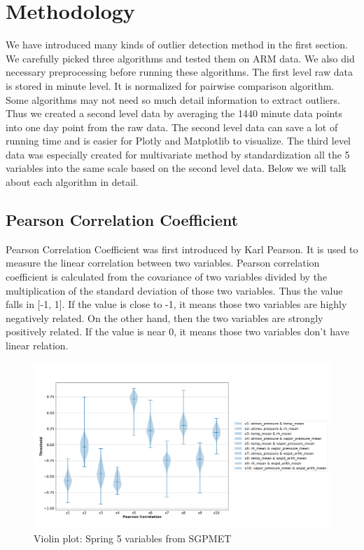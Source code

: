 \documentclass[letterpaper, 10 pt, conference]{ieeeconf}  %
\begin{document}
\section{Methodology}
We have introduced many kinds of outlier detection method in the first section. We carefully picked three algorithms and tested them on ARM data. We also did necessary preprocessing before running these algorithms. The first level raw data is stored in minute level. It is normalized for pairwise comparison algorithm. Some algorithms may not need so much detail information to extract outliers. Thus we created a second level data by averaging the 1440 minute data points into one day point from the raw data. The second level data can save a lot of running time and is easier for Plotly \cite{plotly} and Matplotlib \cite{Hunter:2007} to visualize. The third level data was especially created for multivariate method by standardization all the 5 variables into the same scale based on the second level data. Below we will talk about each algorithm in detail. 

\subsection{Pearson Correlation Coefficient} 
Pearson Correlation Coefficient was first introduced by Karl Pearson\cite{pearson1895note}. It is used to measure the linear correlation between two variables. Pearson correlation coefficient is calculated from the covariance of two variables divided by the multiplication of the standard deviation of those two variables. Thus the value falls in [-1, 1]. If the value is close to -1, it means those two variables are highly negatively related. On the other hand, then the two variables are strongly positively related. If the value is near 0, it means those two variables don't have linear relation. 

\begin{figure}[ht]
    \centering
    \includegraphics[width=\textwidth]{Spring.png}
    \caption{Violin plot: Spring 5 variables from SGPMET}
    \label{fig:pc}
\end{figure}
\end{document}
